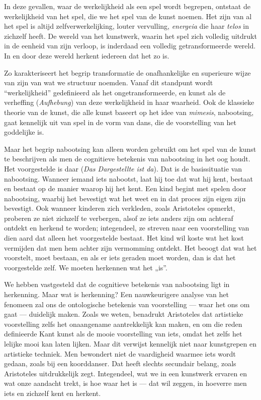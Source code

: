In deze gevallen, waar de werkelijkheid als een spel wordt begrepen, ontstaat de werkelijkheid van het spel, die we het spel van de kunst noemen. Het zijn van al het spel is altijd zelfverwerkelijking, louter vervulling, \textit{energeia} die haar \textit{telos} in zichzelf heeft. De wereld van het kunstwerk, waarin het spel zich volledig uitdrukt in de eenheid van zijn verloop, is inderdaad een volledig getransformeerde wereld. In en door deze wereld herkent iedereen dat het zo is.

Zo karakteriseert het begrip transformatie de onafhankelijke en superieure wijze van zijn van wat we structuur noemden. Vanaf dit standpunt wordt ``werkelijkheid'' gedefinieerd als het ongetransformeerde, en kunst als de verheffing (\textit{Aufhebung}) van deze werkelijkheid in haar waarheid. Ook de klassieke theorie van de kunst, die alle kunst baseert op het idee van \textit{mimesis}, nabootsing, gaat kennelijk uit van spel in de vorm van dans, die de voorstelling van het goddelijke is.

Maar het begrip nabootsing kan alleen worden gebruikt om het spel van de kunst te beschrijven als men de cognitieve betekenis van nabootsing in het oog houdt. Het voorgestelde is daar (\textit{Das Dargestellte ist da}). Dat is de basissituatie van nabootsing. Wanneer iemand iets nabootst, laat hij toe dat wat hij kent, bestaat en bestaat op de manier waarop hij het kent. Een kind begint met spelen door nabootsing, waarbij het bevestigt wat het weet en in dat proces zijn eigen zijn bevestigt. Ook wanneer kinderen zich verkleden, zoals Aristoteles opmerkt, proberen ze niet zichzelf te verbergen, alsof ze iets anders zijn om achteraf ontdekt en herkend te worden; integendeel, ze streven naar een voorstelling van dien aard dat alleen het voorgestelde bestaat. Het kind wil koste wat het kost vermijden dat men hem achter zijn vermomming ontdekt. Het beoogt dat wat het voorstelt, moet bestaan, en als er iets geraden moet worden, dan is dat het voorgestelde zelf. We moeten herkennen wat het „is”.

We hebben vastgesteld dat de cognitieve betekenis van nabootsing ligt in herkenning. Maar wat is herkenning? Een nauwkeurigere analyse van het fenomeen zal ons de ontologische betekenis van voorstelling — waar het ons om gaat — duidelijk maken. Zoals we weten, benadrukt Aristoteles dat artistieke voorstelling zelfs het onaangename aantrekkelijk kan maken, en om die reden definieerde Kant kunst als de mooie voorstelling van iets, omdat het zelfs het lelijke mooi kan laten lijken. Maar dit verwijst kennelijk niet naar kunstgrepen en artistieke techniek. Men bewondert niet de vaardigheid waarmee iets wordt gedaan, zoals bij een koorddanser. Dat heeft slechts secundair belang, zoals Aristoteles uitdrukkelijk zegt. Integendeel, wat we in een kunstwerk ervaren en wat onze aandacht trekt, is hoe waar het is — dat wil zeggen, in hoeverre men iets en zichzelf kent en herkent.

